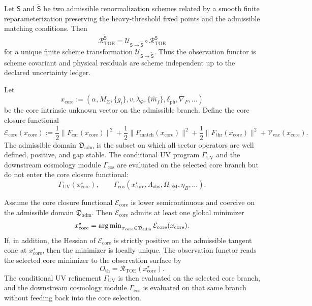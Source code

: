 \begin{proposition}
Let $\mathsf S$ and $\widetilde{\mathsf S}$ be two admissible renormalization schemes related by
a smooth finite reparameterization preserving the heavy-threshold fixed points and the admissible
matching conditions. Then
\[
\mathcal R_{\mathrm{TOE}}^{\widetilde{\mathsf S}}
=
\mathcal U_{\mathsf S\to\widetilde{\mathsf S}}
\circ
\mathcal R_{\mathrm{TOE}}^{\mathsf S}
\]
for a unique finite scheme transformation $\mathcal U_{\mathsf S\to\widetilde{\mathsf S}}$.
Thus the observation functor is scheme covariant and physical residuals are scheme independent
up to the declared uncertainty ledger.
\end{proposition}

\begin{definition}
\label{def:core-closure-functional}
Let
\[
x_{\mathrm{core}}:=(\alpha,M_\Sigma,\{g_i\},v,\lambda_\Phi,\{\hat m_f\},\delta_{\mathrm{ph}},
\nabla_F,\ldots)
\]
be the core intrinsic unknown vector on the admissible branch. Define the core closure
functional
\[
\mathcal E_{\mathrm{core}}(x_{\mathrm{core}}):=
\frac12\|F_{\mathrm{car}}(x_{\mathrm{core}})\|^2
+\frac12\|F_{\mathrm{match}}(x_{\mathrm{core}})\|^2
+\frac12\|F_{\mathrm{thr}}(x_{\mathrm{core}})\|^2
+\mathcal V_{\mathrm{vac}}(x_{\mathrm{core}}).
\]
The admissible domain $\mathfrak D_{\mathrm{adm}}$ is the subset on which all sector operators
are well defined, positive, and gap stable.
The conditional UV program $\Gamma_{\mathrm{UV}}$ and the downstream cosmology module
$\Gamma_{\mathrm{cos}}$ are evaluated on the selected core branch but do not enter the core
closure functional:
\[
\Gamma_{\mathrm{UV}}(x_{\mathrm{core}}^\star),
\qquad
\Gamma_{\mathrm{cos}}(x_{\mathrm{core}}^\star,\Lambda_{\mathrm{obs}},\Omega_{\mathrm{DM}},
\eta_B,\ldots).
\]
\end{definition}

\begin{theorem}
\label{thm:observation-closure}
Assume the core closure functional $\mathcal E_{\mathrm{core}}$ is lower semicontinuous and
coercive on the admissible domain $\mathfrak D_{\mathrm{adm}}$. Then
$\mathcal E_{\mathrm{core}}$ admits at least one global minimizer
\[
x_{\mathrm{core}}^\star=\operatorname{arg\,min}_{x_{\mathrm{core}}\in\mathfrak D_{\mathrm{adm}}}
\mathcal E_{\mathrm{core}}(x_{\mathrm{core}}).
\]
If, in addition, the Hessian of $\mathcal E_{\mathrm{core}}$ is strictly positive on the
admissible tangent cone at $x_{\mathrm{core}}^\star$, then the minimizer is locally unique.
The observation functor reads the selected core minimizer to the observation surface by
\[
O_{\mathrm{th}}=\mathcal R_{\mathrm{TOE}}(x_{\mathrm{core}}^\star).
\]
The conditional UV refinement $\Gamma_{\mathrm{UV}}$ is then evaluated on the selected core
branch, and the downstream cosmology module $\Gamma_{\mathrm{cos}}$ is evaluated on that same
branch without feeding back into the core selection.
\end{theorem}

